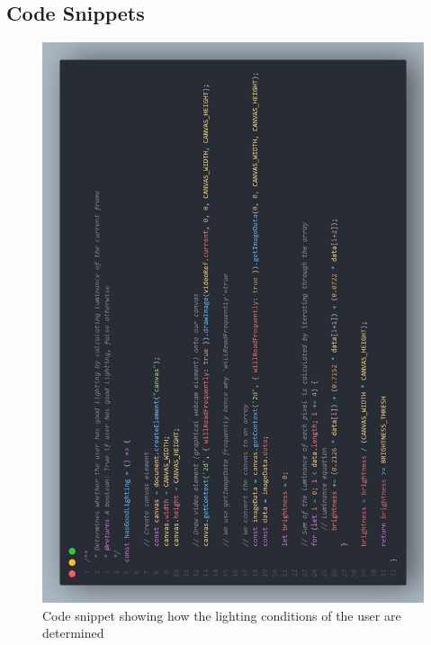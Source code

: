 \documentclass[12pt, a4paper]{article}
\begin{document}
\begin{appendices}
\section{Code Snippets}
\label{appendix:codesnippets}

\begin{figure}[H]
    \centering
    \includegraphics[scale=0.31]{images/codeluminance.png}
    \caption{Code snippet showing how the lighting conditions of the user are determined}
    \label{fig:codeluminance}
\end{figure}

\end{appendices}
\end{document}
